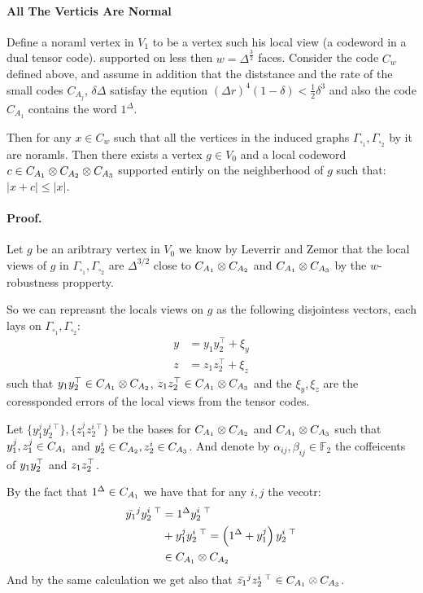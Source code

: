 \documentclass{article}
\begin{document}
\begin{multicols*}{2}
	\paragraph{All The Verticis Are Normal } Define a noraml vertex in $ V_{1} $ to be a vertex such his local view (a codeword in a dual tensor code). 
	supported on less then $w = \Delta^\frac{3}{2}$ faces.
	Consider the code $C_{w}$ defined above, and assume in addition that the diststance and the rate of 
	the small codes $C_{A_{j}}$, $\delta \Delta$ satisfay the eqution $ \left(\Delta r\right)^{4}\left(1 - \delta\right) < \frac{1}{2}\delta^{3} $ and also the code $ C_{A_{1}}  $ 
      contains the word $ 1^{\Delta} $.


      Then for any $x \in C_{w}$ such that all the vertices in the induced graphs $\Gamma_{\square_{1}},\Gamma_{\square_{2}}$  by it are noramls. 
	Then there exists a vertex $ g \in V_{0} $ and a local codeword $ c \in C_{A_{1}} \otimes C_{A_{2}} \otimes C_{A_{3}} $ supported entirly on the neighberhood of $ g $ such that: 
	$ |x + c| \le |x| $.


	\paragraph{Proof.} Let $g$ be an aribtrary vertex in $V_{0}$ we know by Leverrir and Zemor that the local views of $g$ in  $\Gamma_{\square_{1}},\Gamma_{\square_{2}}$ are $\Delta^{3/2}$ close to 
      $C_{A_{1}} \otimes C_{A_{2}} $ and $ C_{A_{1}} \otimes C_{A_{3}} $ by the $w$-robustness propperty. 

	So we can repreasnt the locals views on $g$ as the following disjointess vectors, each lays on $\Gamma_{\square_1},\Gamma_{\square_2}$:
	\begin{equation*}
	  \begin{split}
	    y &= y_{1}y_{2}^{\top} + \xi_{y} \\ 
	    z &= z_{1}z_{2}^{\top} + \xi_{z}
	  \end{split}
	\end{equation*}
	such that $ y_{1}y_{2}^{\top} \in C_{A_{1}} \otimes C_{A_{2}} $,  $z_{1}z_{2}^{\top}\in C_{A_{1}} \otimes C_{A_{3}} $ and the $\xi_{y}, \xi_{z} $ are the coressponded errors of the local views from the tensor codes. 
 
	Let $ \{ y_{1}^{j}y_{2}^{i \ \top} \} ,\{ z_{1}^{j}z_{2}^{i \ \top} \}  $ be the bases for $ C_{A_{1}} \otimes C_{A_{2}} $ and $ C_{A_{1}} \otimes C_{A_{3}} $ such that $ y_{1}^{j}, z_{1}^{j} \in C_{A_{1}} $ and $ y_{2}^{i} \in C_{A_{2}}, z_{2}^{i} \in C_{A_{3}} $.  
	And denote by $\alpha_{ij},\beta_{ij} \in \mathbb{F}_2 $ the coffeicents of $y_{1}y_{2}^{\top}$ and $z_{1}z_{2}^{\top}$. 

	By the fact that $1^\Delta \in C_{A_{1}}$ we have that for any $i,j$ the vecotr: 
	\begin{equation*}
	  \begin{split}
	  \bar{y_{1}}^{j}y_{2}^{i \ \top} & =  1^\Delta y_{2}^{i \ \top} \\ 
	    & + y_{1}^{j}y_{2}^{i \ \top} = \left(1^\Delta +  y_{1}^{j} \right)y_{2}^{i \ \top} \\
	    & \in C_{A_{1}} \otimes C_{A_{2}}
	  \end{split}
	\end{equation*}
      And by the same calculation we get also that $ \bar{z_{1}}^{j}z_{2}^{i \ \top} \in C_{A_{1}} \otimes C_{A_{3}}$.


\end{multicols*}
\end{document}
